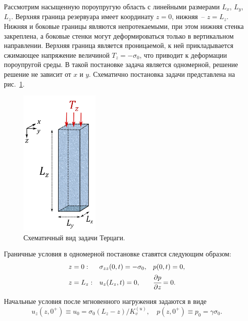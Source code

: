Рассмотрим насыщенную пороупругую область с линейными размерами $L_x$,
$L_y$, $L_z$. Верхняя граница резервуара имеет координату $z=0$,
нижняя~-- $z = L_z$.  Нижняя и боковые границы являются
непротекаемыми, при этом нижняя стенка закреплена, а боковые стенки
могут деформироваться только в вертикальном направлении. Верхняя
граница является проницаемой, к ней прикладывается сжимающее
напряжение величиной $T_z = -\sigma_0$, что приводит к деформации
пороупругой среды. В такой постановке задача является одномерной,
решение решение не зависит от $x$ и $y$.  Схематично постановка задачи
представлена на рис.~\ref{fig:terzaghi}.

%
\begin{figure}[h!]
\centering
\includegraphics[width=0.35\textwidth]{./figs/terzaghi.png}
\caption{Схематичный вид задачи Терцаги.}\label{fig:terzaghi}
\end{figure}
% 

Граничные условия в одномерной постановке ставятся следующим образом:
%
\begin{equation}
\begin{aligned}
\label{eq:bcTer}
%
& z = 0:   & &\sigma_{zz}(0,t) = -\sigma_0, & &p(0,t) = 0, \\
%
& z = L_z: & &u_z(L_z,t) = 0, & &\cfrac{\partial p}{\partial z} = 0.
%
\end{aligned}
\end{equation}
%

Начальные условия после мгновенного нагружения задаются в виде
%
\begin{equation}
\label{eq:icTer}
%
u_z(z,0^+) \equiv u_0 = \sigma_0 (L_z - z) / K_v^{(u)},\quad
p(z,0^+) \equiv p_0 = \gamma \sigma_0.
%
\end{equation}

